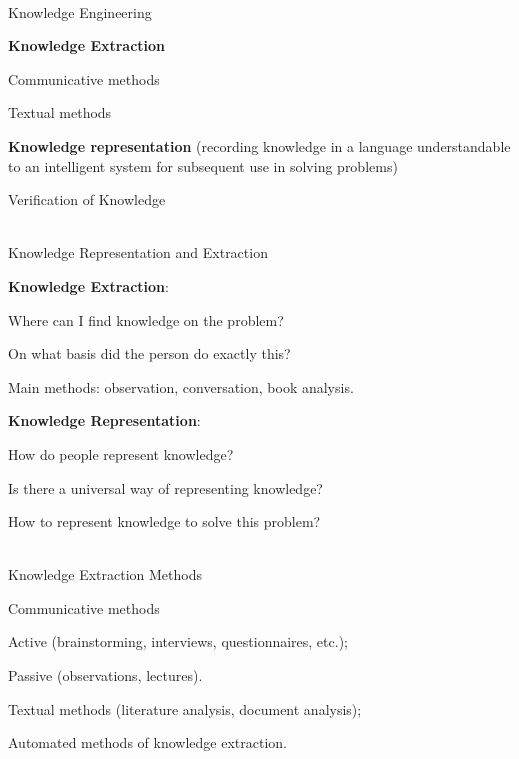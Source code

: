 \begin{frame}{\\Knowledge Engineering}
	\topline
	\justifying
	
	\begin{textitemize}
		\item \textbf{Knowledge Extraction}
		\begin{textitemize}
			\item Communicative methods
			\item Textual methods
		\end{textitemize}
		\item \textbf{Knowledge representation} (recording knowledge in a language understandable to an intelligent system for subsequent use in solving problems)
		
		Verification of Knowledge
	\end{textitemize}
	
\end{frame}

\begin{frame}{\\Knowledge Representation and Extraction}
	\topline
	\justifying
	
	\textbf{Knowledge Extraction}:
	\begin{textitemize}
		\item Where can I find knowledge on the problem?
		\item On what basis did the person do exactly this?
		\item Main methods: observation, conversation, book analysis.
	\end{textitemize}	
	
	\textbf{Knowledge Representation}:
	\begin{textitemize}
		\item How do people represent knowledge?
		\item Is there a universal way of representing knowledge?
		\item How to represent knowledge to solve this problem?
	\end{textitemize}
	
\end{frame}

\begin{frame}{\\Knowledge Extraction Methods}
	\topline
	\justifying
	
	\begin{textitemize}
		\item Communicative methods
		\begin{textitemize}
			\item Active (brainstorming, interviews, questionnaires, etc.);
			\item Passive (observations, lectures).
		\end{textitemize}
		\item Textual methods (literature analysis, document analysis);
		\item Automated methods of knowledge extraction.
	\end{textitemize}
	
\end{frame}


